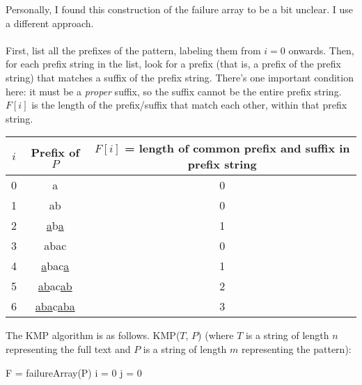 \documentclass[]{article}
\theoremstyle{definition}
\begin{document}
				Personally, I found this construction of the failure array to be a bit unclear. I use a different approach.
				\\ \\
				First, list all the prefixes of the pattern, labeling them from $i = 0$ onwards. Then, for each prefix string in the list, look for a prefix (that is, a prefix of the prefix string) that matches a suffix of the prefix string. There's one important condition here: it must be a \emph{proper} suffix, so the suffix cannot be the entire prefix string. $F[i]$ is the length of the prefix/suffix that match each other, within that prefix string.
				
				\begin{center}
					\begin{tabular}{|c|c|c|}
						\hline
						$i$ & Prefix of $P$ & $F[i]$ = length of common prefix and suffix in prefix string \\ \hline
							0 & a & 0 \\
							1 & ab & 0 \\
							2 & \underline{a}b\underline{a} & 1 \\
							3 & abac & 0 \\
							4 & \underline{a}bac\underline{a} & 1 \\
							5 & \underline{ab}ac\underline{ab} & 2 \\
							6 & \underline{aba}c\underline{aba} & 3 \\ \hline
					\end{tabular}
				\end{center}

				The KMP algorithm is as follows. KMP($T$, $P$) (where $T$ is a string of length $n$ representing the full text and $P$ is a string of length $m$ representing the pattern): \\
				\begin{algorithm}[H]
					F = failureArray(P)\;
					i = 0\;
					j = 0\;
				\end{algorithm}
\end{document}
